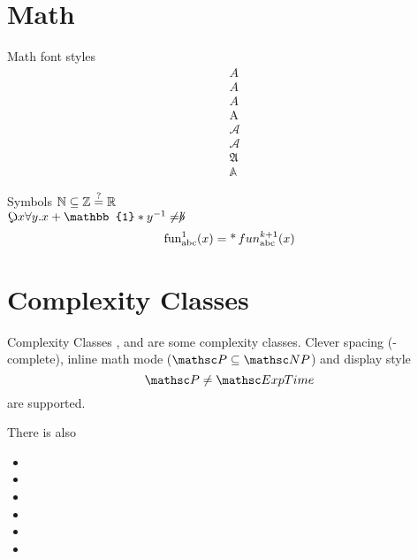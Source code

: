 \documentclass{article}
\begin{document}
\tableofcontents
\newpage

\section{Math}
\begin{latex-example}[lefthand width=3.5cm]{Math font styles}
\begin{align*}
	&A\\
	&\mathord{A}	\\ %
	&\mathit{A} 	\\ %
	&\mathrm{A} 	\\
	&\mathcal{A} 	\\
	&\mathscr{A} 	\\
	&\mathfrak{A} 	\\
	&\mathbb{A}
\end{align*}
\end{latex-example}

\begin{latex-example}[lefthand width=3.5cm]{Symbols}
$\mathbb{N} \subseteq \mathbb{Z} \stackrel{\text{?}}{=} \mathbb{R}$\\
$\quantor x \forall y. x + \mathbb{1} * y^{-1} \neq \blank$
\[
	\operatorname{fun}_{\mathrm{abc}}^{1} (x) = \operatorname{*}{fun}_{\mathrm{abc}}^{k+1} (x)
\]
\end{latex-example}


\section{Complexity Classes}
\begin{latex-example}[lefthand width=5cm]{Complexity Classes}
\PTime, \NP and  are some complexity classes.
Clever spacing (\NP-complete),
inline math mode ($\PTime \subseteq \NP$)
and display style
\[
	\PTime \neq \ExpTime
\]
are supported.

There is also
\begin{itemize}
	\item \kExpTime
	\item \NkExpTime 
	\item \kExpTime[4]
	\item \NkExpTime[4]
	\item \kExpSpace
	\item \kExpSpace[5]
\end{itemize}
\end{latex-example}

\appendix
\end{document}
